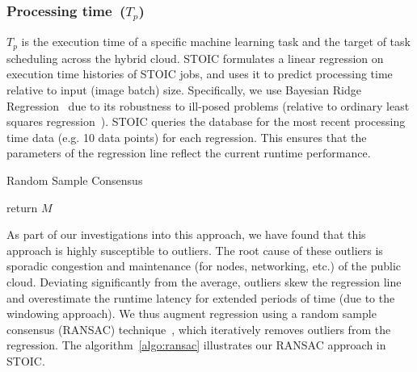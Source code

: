 \subsubsection{Processing time~($T_p$)} 

$T_p$ is the execution time of a specific machine learning task and the target of task scheduling across the hybrid cloud. STOIC formulates a linear regression on execution time histories of STOIC jobs, and uses it to predict processing time relative to input (image batch) size. Specifically, we use Bayesian Ridge Regression~\cite{ref:brr} due to its robustness to ill-posed problems (relative to ordinary least squares regression~\cite{ref:ols}). STOIC queries the database for the most recent processing time data (e.g. 10 data points) for each regression. This ensures that the parameters of the regression line reflect the current runtime performance.

\begin{algorithm}[]
\caption{Random Sample Consensus}
\label{algo:ransac}
\SetAlgoLined
{}
 return $M$
\end{algorithm}
 
As part of our investigations into this approach, we have found that this approach is highly susceptible to outliers. The root cause of these outliers is sporadic congestion and maintenance (for nodes, networking, etc.) of the public cloud. Deviating significantly from the average, outliers skew the regression line and overestimate the runtime latency for extended periods of time (due to the windowing approach). We thus augment regression using a random sample consensus (RANSAC) technique~\cite{ref:ransac}, which iteratively removes outliers from the regression. The algorithm~\ref{algo:ransac} illustrates our RANSAC approach in STOIC.

